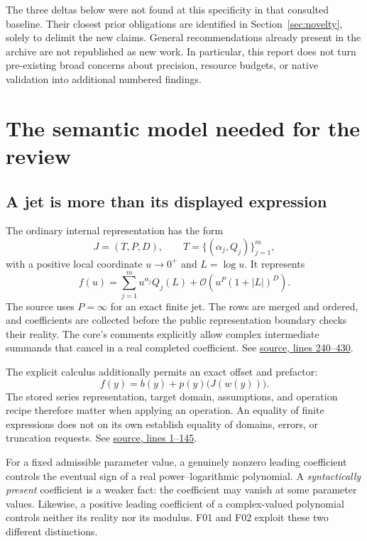 \documentclass[11pt,letterpaper]{article}
\newcommand{\src}[3]{\href{https://github.com/VladimirReshetnikov/Asymptotic/blob/8e859961d7d37f008b826f3a8cad406460271614/#1\#L#2-L#3}{source, lines #2--#3}}
\newcommand{\Oterm}{\mathcal{O}}
\begin{document}
The three deltas below were not found at this specificity in that consulted baseline. Their closest prior obligations are identified in Section~\ref{sec:novelty}, solely to delimit the new claims. General recommendations already present in the archive are not republished as new work. In particular, this report does not turn pre-existing broad concerns about precision, resource budgets, or native validation into additional numbered findings.

\section{The semantic model needed for the review}

\subsection{A jet is more than its displayed expression}

The ordinary internal representation has the form
\[
 J=(T,P,D),\qquad
 T=\{(\alpha_j,Q_j)\}_{j=1}^{m},
\]
with a positive local coordinate $u\to0^+$ and $L=\log u$. It represents
\begin{equation}\label{eq:jet}
 f(u)=\sum_{j=1}^{m}u^{\alpha_j}Q_j(L)
       +\Oterm\!\left(u^P(1+|L|)^D\right).
\end{equation}
The source uses $P=\infty$ for an exact finite jet. The rows are merged and ordered, and coefficients are collected before the public representation boundary checks their reality. The core's comments explicitly allow complex intermediate summands that cancel in a real completed coefficient.\cite{core} See \src{src/Kernel/AsymptoticAnalysis.wl}{240}{430}.

The explicit calculus additionally permits an exact offset and prefactor:
\[
 f(y)=b(y)+p(y)\bigl(J(w(y))\bigr).
\]
The stored series representation, target domain, assumptions, and operation recipe therefore matter when applying an operation. An equality of finite expressions does not on its own establish equality of domains, errors, or truncation requests.\cite{operations} See \src{src/Kernel/SeriesOperations.wl}{1}{145}.

For a fixed admissible parameter value, a genuinely nonzero leading coefficient controls the eventual sign of a real power--logarithmic polynomial. A \emph{syntactically present} coefficient is a weaker fact: the coefficient may vanish at some parameter values. Likewise, a positive leading coefficient of a complex-valued polynomial controls neither its reality nor its modulus. F01 and F02 exploit these two different distinctions.
\end{document}

